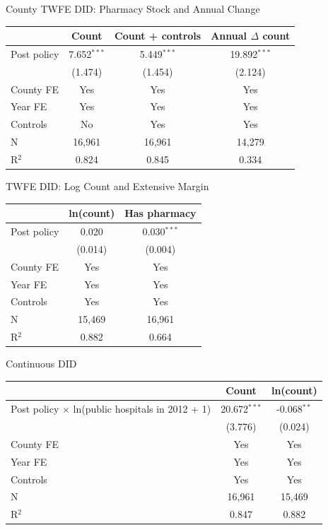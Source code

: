 \documentclass{beamer}
\begin{document}
\begin{frame}{County TWFE DID: Pharmacy Stock and Annual Change}

\centering
\scriptsize
\setlength{\tabcolsep}{6pt}

\begin{tabular}{lccc}
\toprule
& Count & Count + controls & Annual $\Delta$ count \\
\midrule
Post policy
& 7.652$^{***}$ & 5.449$^{***}$ & 19.892$^{***}$ \\
& (1.474) & (1.454) & (2.124) \\
\midrule
County FE & Yes & Yes & Yes \\
Year FE & Yes & Yes & Yes \\
Controls & No & Yes & Yes \\
\midrule
N & 16,961 & 16,961 & 14,279 \\
R$^2$ & 0.824 & 0.845 & 0.334 \\
\bottomrule
\end{tabular}

\end{frame}

\begin{frame}{ TWFE DID: Log Count and Extensive Margin}

\centering
\scriptsize
\setlength{\tabcolsep}{7pt}

\begin{tabular}{lcc}
\toprule
& ln(count) & Has pharmacy \\
\midrule
Post policy
& 0.020 & 0.030$^{***}$ \\
& (0.014) & (0.004) \\
\midrule
County FE & Yes & Yes \\
Year FE & Yes & Yes \\
Controls & Yes & Yes \\
\midrule
N & 15,469 & 16,961 \\
R$^2$ & 0.882 & 0.664 \\
\bottomrule
\end{tabular}

\end{frame}
\begin{frame}{ Continuous DID}

\centering
\scriptsize
\setlength{\tabcolsep}{7pt}

\begin{tabular}{lcc}
\toprule
& Count & ln(count) \\
\midrule
Post policy $\times$ ln(public hospitals in 2012 + 1)
& 20.672$^{***}$ & -0.068$^{**}$ \\
& (3.776) & (0.024) \\
\midrule
County FE & Yes & Yes \\
Year FE & Yes & Yes \\
Controls & Yes & Yes \\
\midrule
N & 16,961 & 15,469 \\
R$^2$ & 0.847 & 0.882 \\
\bottomrule
\end{tabular}


\end{frame}
\end{document}
